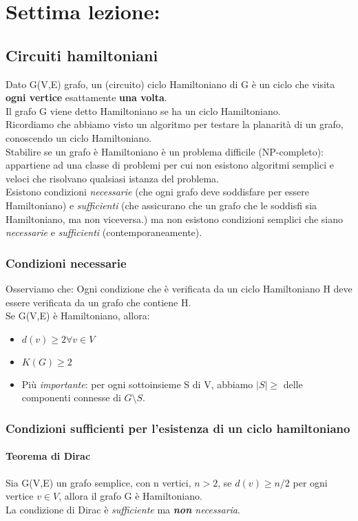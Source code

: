 \section{Settima lezione: }
\subsection{Circuiti hamiltoniani}
Dato G(V,E) grafo, un (circuito) ciclo Hamiltoniano di G è un ciclo che visita \textbf{ogni vertice} esattamente
\textbf{una volta}. \\
Il grafo G viene detto Hamiltoniano se ha un ciclo Hamiltoniano. \\
Ricordiamo che abbiamo visto un algoritmo per testare la planarità di un grafo, conoscendo un ciclo
Hamiltoniano. \\
Stabilire se un grafo è Hamiltoniano è un problema difficile (NP-completo): appartiene ad una classe di
problemi per cui non esistono algoritmi semplici e veloci che risolvano qualsiasi istanza del problema. \\
Esistono condizioni \emph{necessarie} (che ogni grafo deve soddisfare per essere Hamiltoniano) e \emph{sufficienti} (che assicurano che un grafo che le soddisfi sia Hamiltoniano, ma non viceversa.) ma non esistono condizioni semplici che siano \emph{necessarie} e \emph{sufficienti} (contemporaneamente).\\

\noindent
\subsubsection{Condizioni necessarie}
Osserviamo che: Ogni condizione che è verificata da un ciclo Hamiltoniano H deve essere verificata da un grafo
che contiene H. \\
Se G(V,E) è Hamiltoniano, allora:
\begin{itemize}
    \item \(d(v) \geq 2  \forall v \in V\)
    \item \(K(G) \geq 2 \)
    \item Più \emph{importante}: per ogni sottoinsieme S di V, abbiamo \( |S| \geq \) delle componenti connesse di \(G \setminus S\).
\end{itemize}

\subsubsection{Condizioni sufficienti per l'esistenza di un ciclo hamiltoniano}
\paragraph{Teorema di Dirac} Sia G(V,E) un grafo semplice, con n vertici, \(n>2\), se \(d(v) \geq n/2\) per ogni vertice \(v \in V\), allora il grafo G è Hamiltoniano. \\
La condizione di Dirac è \emph{sufficiente} ma \emph{\textbf{non} necessaria}.

